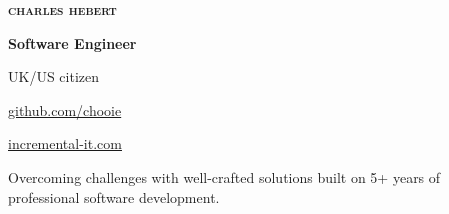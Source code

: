 \begin{center}
  \begin{lsstyle}
    {\Huge \scshape \bfseries charles hebert}
  \end{lsstyle}

  \vspace*{0.5em}

  \textbf{Software Engineer}

  UK/US citizen
\end{center}

\begin{small}

\noindent
\begin{minipage}[t]{0.6\textwidth}
\end{minipage}
\noindent
\noindent
\begin{minipage}[t]{0.4\textwidth}
  \begin{description}
    \raggedleft
    \item[My code] \href{http://www.github.com/chooie}{github.com/chooie}
    \item[Website]
      \href{http://incremental-it.com}{incremental-it.com}
  \end{description}
\end{minipage}

\end{small}

\vspace{1.5em}

\noindent
Overcoming challenges with well-crafted solutions built on 5+ years of
professional software development.

\vspace{1.5em}

